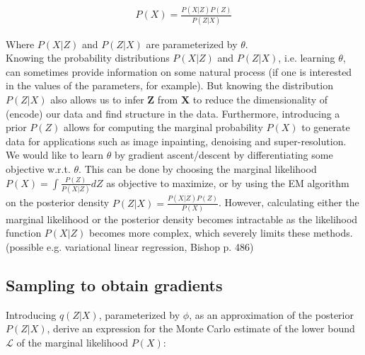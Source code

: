 \documentclass{article}
\begin{document}
\begin{align}
P(X) = \frac{P(X|Z)P(Z)}{P(Z|X)}
\end{align}

Where $P(X|Z)$ and $P(Z|X)$ are parameterized by $\theta$.
\\

Knowing the probability distributions $P(X|Z)$ and $P(Z|X)$, i.e. learning $\theta$, can sometimes provide information on some natural process (if one is interested in the values of the parameters, for example). But knowing the distribution $P(Z|X)$ also allows us to infer $\mathbf{Z}$ from $\mathbf{X}$ to reduce the dimensionality of (encode) our data and find structure in the data. Furthermore, introducing a prior $P(Z)$ allows for computing the marginal probability $P(X)$ to generate data for applications such as image inpainting, denoising and super-resolution.
We would like to learn $\theta$ by gradient ascent/descent by differentiating some objective w.r.t. $\theta$. This can be done by choosing the marginal likelihood $P(X) = \int \frac{P(Z)}{P(X|Z)}dZ$ as objective to maximize, or by using the EM algorithm on the posterior density $ P(Z|X) = \frac{P(X|Z)P(Z)}{P(X)}$. However, calculating either  the marginal likelihood or the posterior density becomes intractable as the likelihood function $P(X|Z)$	 becomes more complex, which severely limits these methods. (possible e.g. variational linear regression, Bishop p. 486)






\subsection{Sampling to obtain gradients}

Introducing $q(Z|X)$, parameterized by $\phi$, as an approximation of the posterior $P(Z|X)$, \cite{kingma2013auto} derive an expression for the Monte Carlo estimate of the lower bound $\mathcal{L}$ of the marginal likelihood $P(X)$:
\end{document}
